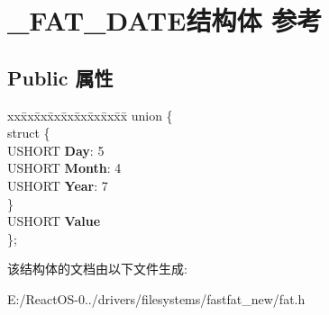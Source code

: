 \hypertarget{struct___f_a_t___d_a_t_e}{}\section{\+\_\+\+F\+A\+T\+\_\+\+D\+A\+T\+E结构体 参考}
\label{struct___f_a_t___d_a_t_e}
\subsection*{Public 属性}
\begin{DoxyCompactItemize}
\item 
\mbox{\label{struct___f_a_t___d_a_t_e_ab687e1ec155ee055a1808cacc4568bea}} 
\begin{tabbing}
xx\=xx\=xx\=xx\=xx\=xx\=xx\=xx\=xx\=\kill
union \{\\
\mbox{\label{union___f_a_t___d_a_t_e_1_1_0D642_ac287a04f5b14e28ff2e441815a1b319b}} 
\>struct \{\\
\>\>USHORT {\bfseries Day}: 5\\
\>\>USHORT {\bfseries Month}: 4\\
\>\>USHORT {\bfseries Year}: 7\\
\>\} \\
\>USHORT {\bfseries Value}\\
\}; \\

\end{tabbing}\end{DoxyCompactItemize}


该结构体的文档由以下文件生成\+:\begin{DoxyCompactItemize}
\item 
E\+:/\+React\+O\+S-\/0../drivers/filesystems/fastfat\+\_\+new/fat.\+h\end{DoxyCompactItemize}

